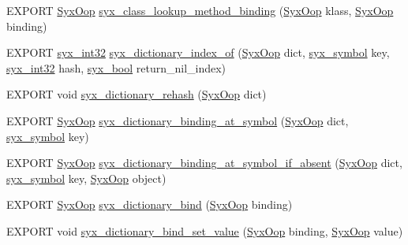 \begin{CompactItemize}
\item 
EXPORT \hyperlink{syx-types_8h_1121caba2d40b2ce090b640762744ccd}{SyxOop} \hyperlink{syx-object_8h_6f70b46648620575942260a24264cb8f}{syx\_\-class\_\-lookup\_\-method\_\-binding} (\hyperlink{syx-types_8h_1121caba2d40b2ce090b640762744ccd}{SyxOop} klass, \hyperlink{syx-types_8h_1121caba2d40b2ce090b640762744ccd}{SyxOop} binding)
\item 
EXPORT \hyperlink{syx-types_8h_9f31c17555a2dfcf25da84b5c4a2e55b}{syx\_\-int32} \hyperlink{syx-object_8h_4d007f448f92d47915f0f9b03abcffea}{syx\_\-dictionary\_\-index\_\-of} (\hyperlink{syx-types_8h_1121caba2d40b2ce090b640762744ccd}{SyxOop} dict, \hyperlink{syx-types_8h_9663af54b7b72f5d8be5f754ef356525}{syx\_\-symbol} key, \hyperlink{syx-types_8h_9f31c17555a2dfcf25da84b5c4a2e55b}{syx\_\-int32} hash, \hyperlink{syx-types_8h_c6dc09b276b99fa1956364359139daab}{syx\_\-bool} return\_\-nil\_\-index)
\item 
EXPORT void \hyperlink{syx-object_8h_29f9745780d60c8acb1ad0dc4364fe57}{syx\_\-dictionary\_\-rehash} (\hyperlink{syx-types_8h_1121caba2d40b2ce090b640762744ccd}{SyxOop} dict)
\item 
EXPORT \hyperlink{syx-types_8h_1121caba2d40b2ce090b640762744ccd}{SyxOop} \hyperlink{syx-object_8h_a7e087f1a8becf74a1e37463e3a7c5cc}{syx\_\-dictionary\_\-binding\_\-at\_\-symbol} (\hyperlink{syx-types_8h_1121caba2d40b2ce090b640762744ccd}{SyxOop} dict, \hyperlink{syx-types_8h_9663af54b7b72f5d8be5f754ef356525}{syx\_\-symbol} key)
\item 
EXPORT \hyperlink{syx-types_8h_1121caba2d40b2ce090b640762744ccd}{SyxOop} \hyperlink{syx-object_8h_9712ba3f5f6614d91900aabce7a5ce53}{syx\_\-dictionary\_\-binding\_\-at\_\-symbol\_\-if\_\-absent} (\hyperlink{syx-types_8h_1121caba2d40b2ce090b640762744ccd}{SyxOop} dict, \hyperlink{syx-types_8h_9663af54b7b72f5d8be5f754ef356525}{syx\_\-symbol} key, \hyperlink{syx-types_8h_1121caba2d40b2ce090b640762744ccd}{SyxOop} object)
\item 
EXPORT \hyperlink{syx-types_8h_1121caba2d40b2ce090b640762744ccd}{SyxOop} \hyperlink{syx-object_8h_92ca3959db07b272c56e9ba5cb22dd7a}{syx\_\-dictionary\_\-bind} (\hyperlink{syx-types_8h_1121caba2d40b2ce090b640762744ccd}{SyxOop} binding)
\item 
EXPORT void \hyperlink{syx-object_8h_05356bb26948688722ef15999e182fff}{syx\_\-dictionary\_\-bind\_\-set\_\-value} (\hyperlink{syx-types_8h_1121caba2d40b2ce090b640762744ccd}{SyxOop} binding, \hyperlink{syx-types_8h_1121caba2d40b2ce090b640762744ccd}{SyxOop} value)
\item 

\end{CompactItemize}
